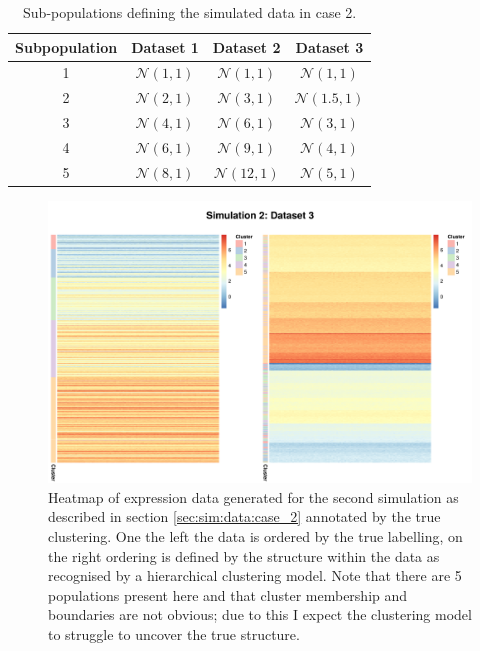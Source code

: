 \documentclass[12pt]{article} %
\begin{document}
\begin{table}[!htb] 
	\centering
	\begin{tabular}{c|ccc} 
		Subpopulation	& Dataset 1	& Dataset 2	& Dataset 3	\\ 
		\hline
		1 		& $\mathcal{N}(1,1)$	& $\mathcal{N}(1,1)$ 	& $\mathcal{N}(1,1)$	\\
		2 		& $\mathcal{N}(2,1)$	& $\mathcal{N}(3,1)$ 	& $\mathcal{N}(1.5,1)$	\\
		3 		& $\mathcal{N}(4,1)$	& $\mathcal{N}(6,1)$ 	& $\mathcal{N}(3,1)$	\\
		4 		& $\mathcal{N}(6,1)$	& $\mathcal{N}(9,1)$ 	& $\mathcal{N}(4,1)$	\\
		5 		& $\mathcal{N}(8,1)$	& $\mathcal{N}(12,1)$ 	& $\mathcal{N}(5,1)$	
	\end{tabular}
	\caption{Sub-populations defining the simulated data in case 2.}
	\label{table:generated_data_case_2}
\end{table}

	\begin{figure} %
		\centering
		\includegraphics[scale=0.7]{Images/Gen_data/Case_2/dataset_3_comp_clustered_unclustered.png}
		\caption{Heatmap of expression data generated for the second simulation as described in section \ref{sec:sim:data:case_2} annotated by the true clustering. One the left the data is ordered by the true labelling, on the right ordering is defined by the structure within the data as recognised by a hierarchical clustering model. Note that there are 5 populations present here and that cluster membership and boundaries are not obvious; due to this I expect the clustering model to struggle to uncover the true structure.}
		\label{fig:gen_data_3_sim_case_2}
	\end{figure}
\end{document}
